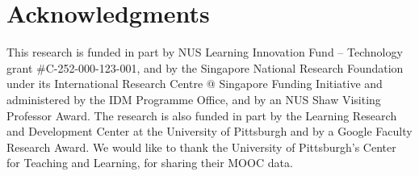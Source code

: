 \documentclass[letterpaper]{article}
\begin{document}

\section*{Acknowledgments}
This research is funded in part by NUS Learning Innovation Fund --
Technology grant \#C-252-000-123-001, and by the Singapore National
Research Foundation under its International Research Centre @
Singapore Funding Initiative and administered by the IDM Programme
Office, and by an NUS Shaw Visiting Professor Award. The research is also 
funded in part by the Learning Research and Development Center at the 
University of Pittsburgh and by a Google Faculty Research Award. We would like 
to thank the University of Pittsburgh's Center for Teaching and Learning, for 
sharing their MOOC data. 


\end{document}
